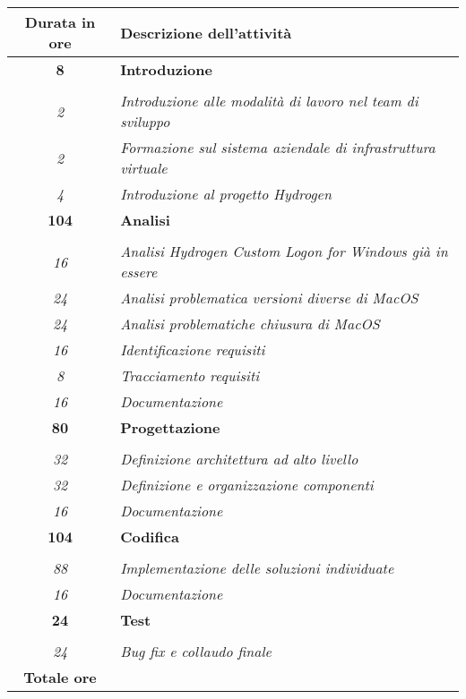

\begin{tabularx}{\textwidth}{|c|X|}
	\hline
	\textbf{Durata in ore} & \textbf{Descrizione dell'attività} \\\hline
	
	\textbf{8} & \textbf{Introduzione} \\ \hdashline
    \multirow{3}{0cm}\\
    \textit{2} & 
    \textit{Introduzione alle modalità di lavoro nel team di sviluppo} \\
    \textit{2} & 
    \textit{Formazione sul sistema aziendale di infrastruttura virtuale} \\
    \textit{4} &
    \textit{Introduzione al progetto Hydrogen} \\
    \hline
    
    \textbf{104} & \textbf{Analisi} \\ \hdashline 
    \multirow{3}{0cm}\\ 
    \textit{16} & 
    \textit{Analisi Hydrogen Custom Logon for Windows già in essere} \\
    \textit{24} & 
    \textit{Analisi problematica versioni diverse di MacOS} \\
    \textit{24} & 
    \textit{Analisi problematiche chiusura di MacOS} \\
    \textit{16} & 
    \textit{Identificazione requisiti} \\
   	\textit{8} & 
    \textit{Tracciamento requisiti} \\
    \textit{16} & 
    \textit{Documentazione} \\
    \hline
    
    \textbf{80} & \textbf{Progettazione}  \\ \hdashline 
    \multirow{4}{0cm}\\ 
    \textit{32} & 
    \textit{Definizione architettura ad alto livello} \\
    \textit{32} & 
    \textit{Definizione e organizzazione componenti} \\
    \textit{16} & 
    \textit{Documentazione} \\
    \hline
    
    \textbf{104} & \textbf{Codifica}  \\ \hdashline 
    \multirow{4}{0cm}\\ 
    \textit{88} & 
    \textit{Implementazione delle soluzioni individuate} \\
    \textit{16} & 
    \textit{Documentazione} \\
    \hline
	
	\textbf{24} & \textbf{Test}  \\ \hdashline 
	\multirow{4}{0cm}\\ 
	\textit{24} & 
	\textit{Bug fix e collaudo finale} \\
	\hline
	
	\textbf{Totale ore} & \multicolumn{1}{|c|}{\textbf{\totaleOre}} \\\hline
	
	
\end{tabularx}